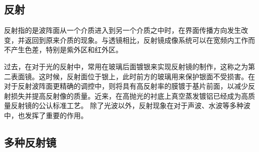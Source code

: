 \begin{issues}
\issueDraft
\issueMissDepend
\end{issues}

\subsection{反射}
反射指的是波阵面从一个介质进入到另一个介质之中时，在界面传播方向发生改变，并返回到原来介质的现象。与透镜相比，反射镜成像系统可以在宽频内工作而不产生色差，特别是紫外区和红外区。

过去，在对于光的反射中，常用在玻璃后面镀银来实现反射镜的制作，这称之为第二表面镜。这时候，反射面位于银上，此时前方的玻璃用来保护银面不受损害。在对于反射波阵面更精确的调控中，则将具有高反射率的膜镀于基片前面，以减少反射损失并提高反射像的质量。近来，在高抛光的衬底上真空蒸发镀铝已经成为高质量反射镜的公认标准工艺。
除了光波以外，反射现象在对于声波、水波等多种波中，也发挥了重要的作用。
\subsection{多种反射镜}

